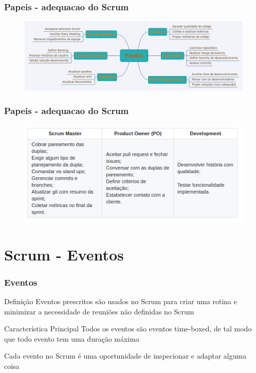 \begin{frame}
 \frametitle{Papeis - adequacao do Scrum}
  \begin{figure}
   \centering
   \includegraphics[width = \textwidth]{figs/Papeis2.png}
  \end{figure}
\end{frame}

\begin{frame}
 \frametitle{Papeis - adequacao do Scrum}
  \begin{figure}
   \centering
   \includegraphics[width = \textwidth]{figs/missaonascente.png}
  \end{figure}
\end{frame}


\section{Scrum - Eventos}

\begin{frame}
 \frametitle{Eventos}
 \begin{block}{Definição}
 Eventos prescritos são usados no Scrum para criar uma rotina e minimizar a necessidade de
reuniões não definidas no Scrum
 \end{block}
  \begin{block}{Característica Principal}
 Todos os eventos são eventos time-boxed, de tal modo que
todo evento tem uma duração máxima
 \end{block}
   \begin{block}{}
Cada evento no Scrum é uma
oportunidade de inspecionar e adaptar alguma coisa
 \end{block}
\end{frame}


